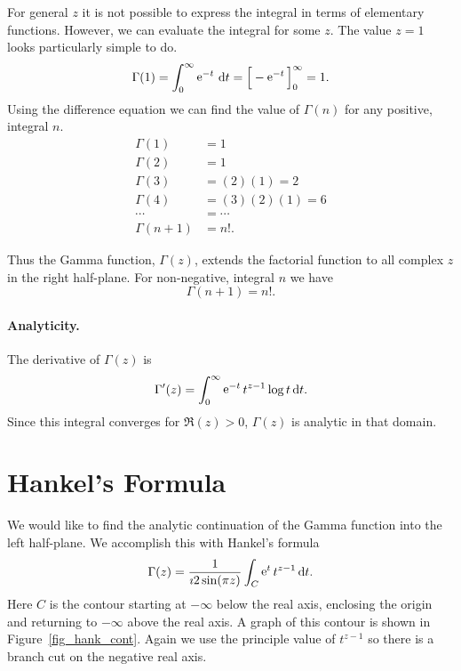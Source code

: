 For general $z$ it is not possible to express the integral in terms of 
elementary functions.  However, we can evaluate the integral for some $z$.
The value $z = 1$ looks particularly simple to do.
\[ \Gamma(1) = \int_0^\infty\mathop{\mathrm{e}}\nolimits^{-t}\,\mathrm{d} t = \Big[-\mathop{\mathrm{e}}\nolimits^{-t}\Big]_0^\infty= 1. \]
Using the difference equation we can find the value of $\Gamma(n)$ for any 
positive, integral $n$.
\begin{align*}
  \Gamma(1) &= 1 \\
  \Gamma(2) &= 1 \\
  \Gamma(3) &= (2)(1) = 2 \\
  \Gamma(4) &= (3)(2)(1) = 6 \\
  \cdots    &= \cdots \\
  \Gamma(n+1) &= n!.
\end{align*}


Thus the Gamma function, $\Gamma(z)$, extends the factorial function to all
complex $z$ in the right half-plane.  For non-negative, integral $n$ we have
\[ \boxed{ \Gamma(n+1) = n!. } \]


\paragraph{Analyticity.}
The derivative of $\Gamma(z)$ is
\[ \Gamma'(z) = \int_0^\infty\mathop{\mathrm{e}}\nolimits^{-t} t^{z-1} \log t\,\mathrm{d} t.\]
Since this integral converges for $\Re(z) > 0$, $\Gamma(z)$ is analytic
in that domain.














\section{Hankel's Formula}

We would like to find the analytic continuation of the Gamma function into
the left half-plane.  We accomplish this with Hankel's formula
\[ \Gamma(z) = \frac{1}{\imath 2 \sin(\pi z)} \int_C \mathop{\mathrm{e}}\nolimits^t t^{z-1}\,\mathrm{d} t. \]
Here $C$ is the contour starting at $-\infty$ below the real axis, enclosing
the origin and returning to $-\infty$ above the real axis.  A graph of this
contour is shown in Figure~\ref{fig_hank_cont}.  Again we use the 
principle value of $t^{z-1}$ so there is a branch cut on the negative real axis.  

